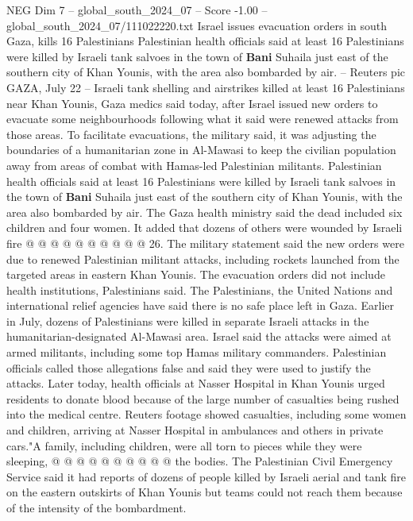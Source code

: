 \begin{textsample}{NEG Dim 7 – global\_south\_2024\_07 – Score -1.00 – global\_south\_2024\_07/111022220.txt}  \label{ex:f7_neg_349}
Israel issues evacuation orders in south Gaza, kills 16 Palestinians Palestinian health officials said at least 16 Palestinians were killed by Israeli tank salvoes in the town of \textbf{Bani} Suhaila just east of the southern city of Khan Younis, with the area also bombarded by air. -- Reuters pic GAZA, July 22 -- Israeli tank shelling and airstrikes killed at least 16 Palestinians near Khan Younis, Gaza medics said today, after Israel issued new orders to evacuate some neighbourhoods following what it said were renewed attacks from those areas.
To facilitate evacuations, the military said, it was adjusting the boundaries of a humanitarian zone in Al-Mawasi to keep the civilian population away from areas of combat with Hamas-led Palestinian militants.
Palestinian health officials said at least 16 Palestinians were killed by Israeli tank salvoes in the town of \textbf{Bani} Suhaila just east of the southern city of Khan Younis, with the area also bombarded by air.
The Gaza health ministry said the dead included six children and four women.
It added that dozens of others were wounded by Israeli fire @ @ @ @ @ @ @ @ @ @ 26.
The military statement said the new orders were due to renewed Palestinian militant attacks, including rockets launched from the targeted areas in eastern Khan Younis.
The evacuation orders did not include health institutions, Palestinians said.
The Palestinians, the United Nations and international relief agencies have said there is no safe place left in Gaza.
Earlier in July, dozens of Palestinians were killed in separate Israeli attacks in the humanitarian-designated Al-Mawasi area.
Israel said the attacks were aimed at armed militants, including some top Hamas military commanders.
Palestinian officials called those allegations false and said they were used to justify the attacks.
Later today, health officials at Nasser Hospital in Khan Younis urged residents to donate blood because of the large number of casualties being rushed into the medical centre.
Reuters footage showed casualties, including some women and children, arriving at Nasser Hospital in ambulances and others in private cars."A family, including children, were all torn to pieces while they were sleeping, @ @ @ @ @ @ @ @ @ @ the bodies.
The Palestinian Civil Emergency Service said it had reports of dozens of people killed by Israeli aerial and tank fire on the eastern outskirts of Khan Younis but teams could not reach them because of the intensity of the bombardment.

\end{textsample}
